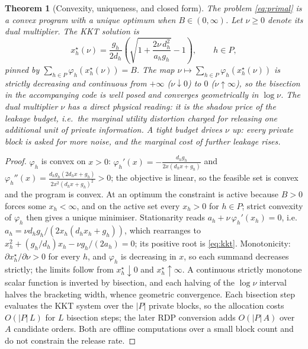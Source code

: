 \documentclass{ieeetj}
\theoremstyle{plain}
\newtheorem{theorem}{Theorem}
\theoremstyle{definition}
\begin{document}
\begin{theorem}[Convexity, uniqueness, and closed form]
\label{th:allocation}
The problem \eqref{eq:primal} is a convex program with a unique optimum when
$B\in(0,\infty)$. Let $\nu\ge0$ denote its dual multiplier. The KKT solution is
\begin{equation}
x_h^{\star}(\nu)=\frac{g_h}{2d_h}\left(
\sqrt{1+\frac{2\nu\,d_h^{2}}{a_h g_h}}-1\right),\qquad h\in P,
\label{eq:kkt}
\end{equation}
pinned by $\sum_{h\in P}\varphi_h(x_h^\star(\nu))=B$. The map
$\nu\mapsto\sum_{h\in P}\varphi_h(x_h^\star(\nu))$ is strictly decreasing and
continuous from $+\infty$ ($\nu\downarrow0$) to $0$ ($\nu\uparrow\infty$), so
the bisection in the accompanying code is well posed and converges
geometrically in $\log\nu$. The dual multiplier $\nu$ has a direct physical
reading: it is the shadow price of the leakage budget, i.e.\ the marginal
utility distortion charged for releasing one additional unit of private
information. A tight budget drives $\nu$ up: every private block is asked for
more noise, and the marginal cost of further leakage rises.
\end{theorem}

\begin{proof}
$\varphi_h$ is convex on $x>0$:
$\varphi_h'(x)=-\frac{d_hg_h}{2x(d_hx+g_h)}$ and
$\varphi_h''(x)=\frac{d_hg_h(2d_hx+g_h)}{2x^2(d_hx+g_h)^2}>0$; the objective is
linear, so the feasible set is convex and the program is convex. At an optimum
the constraint is active because $B>0$ forces some $x_h<\infty$, and on the
active set every $x_h>0$ for $h\in P$; strict convexity of $\varphi_h$ then
gives a unique minimiser. Stationarity reads
$a_h+\nu\,\varphi_h'(x_h)=0$, i.e.
$a_h=\nu d_hg_h/(2x_h(d_hx_h+g_h))$, which rearranges to
$x_h^2+(g_h/d_h)x_h-\nu g_h/(2a_h)=0$; its positive root is \eqref{eq:kkt}.
Monotonicity: $\partial x_h^\star/\partial\nu>0$ for every $h$, and
$\varphi_h$ is decreasing in $x$, so each summand decreases strictly; the
limits follow from $x_h^\star\downarrow0$ and $x_h^\star\uparrow\infty$. A
continuous strictly monotone scalar function is inverted by bisection, and
each halving of the $\log\nu$ interval halves the bracketing width, whence
geometric convergence. Each bisection step evaluates the KKT system over the
$|P|$ private blocks, so the allocation costs $O(|P|\,L)$ for $L$ bisection
steps; the later RDP conversion adds $O(|P|\,A)$ over $A$ candidate orders.
Both are offline computations over a small block count and do not constrain the
release rate.
\end{proof}
\end{document}
